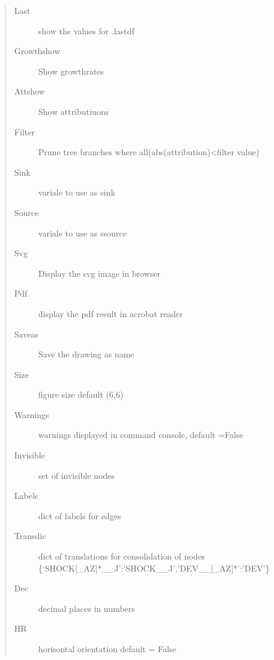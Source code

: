 \documentclass[letterpaper,10pt,english]{sphinxmanual}
\begin{document}
\begin{fulllineitems}
\begin{fulllineitems}
\begin{quote}
\begin{description}
\item[{Last}] \leavevmode
\sphinxAtStartPar
show the values for .lastdf

\item[{Growthshow}] \leavevmode
\sphinxAtStartPar
Show growthrates

\item[{Attshow}] \leavevmode
\sphinxAtStartPar
Show attributiuons

\item[{Filter}] \leavevmode
\sphinxAtStartPar
Prune tree branches where all(abs(attribution)\textless{}filter value)

\item[{Sink}] \leavevmode
\sphinxAtStartPar
variale to use as sink

\item[{Source}] \leavevmode
\sphinxAtStartPar
variale to use as ssource

\item[{Svg}] \leavevmode
\sphinxAtStartPar
Display the svg image in browser

\item[{Pdf}] \leavevmode
\sphinxAtStartPar
display the pdf result in acrobat reader

\item[{Saveas}] \leavevmode
\sphinxAtStartPar
Save the drawing as name

\item[{Size}] \leavevmode
\sphinxAtStartPar
figure size default (6,6)

\item[{Warnings}] \leavevmode
\sphinxAtStartPar
warnings displayed in command console, default =False

\item[{Invisible}] \leavevmode
\sphinxAtStartPar
set of invisible nodes

\item[{Labels}] \leavevmode
\sphinxAtStartPar
dict of labels for edges

\item[{Transdic}] \leavevmode
\sphinxAtStartPar
dict of translations for consolidation of nodes \{‘SHOCK{[}\_A\sphinxhyphen{}Z{]}*\_\_J’:’SHOCK\_\_J’,’DEV\_\_{[}\_A\sphinxhyphen{}Z{]}*’:’DEV’\}

\item[{Dec}] \leavevmode
\sphinxAtStartPar
decimal places in numbers

\item[{HR}] \leavevmode
\sphinxAtStartPar
horisontal orientation default = False


\end{description}
\end{quote}
\end{fulllineitems}
\end{fulllineitems}
\end{document}
